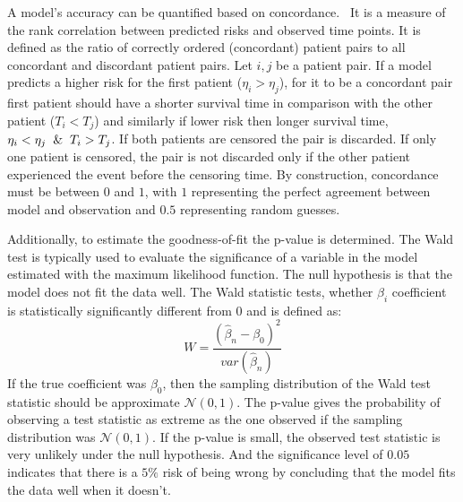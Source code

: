 A model's accuracy can be quantified based on concordance.~\cite{therneau20201} 
It is a measure of the rank correlation between predicted risks and observed time points. 
It is defined as the ratio of correctly ordered (concordant) patient pairs to all concordant and discordant patient pairs.
Let $i, j$ be a patient pair. If a model predicts a higher risk for the first patient ($\eta_i > \eta_j$), for it to be a concordant pair first patient should have a shorter survival time in comparison with the other patient ($ T_i < T_j$) and similarly if lower risk then longer survival time, $\eta_i < \eta_j \And T_i > T_j$.
If both patients are censored the pair is discarded.
If only one patient is censored, the pair is not discarded only if the other patient experienced the event before the censoring time. By construction, concordance must be between $0$ and $1$, with $1$
representing the perfect agreement between model and
observation and $0.5$ representing random guesses.

Additionally, to estimate the goodness-of-fit the p-value is determined. The Wald test is typically used to evaluate the significance of a variable in the model estimated with the maximum likelihood function. The null hypothesis is that the model does not fit the data well. The Wald statistic tests, whether $\beta_i$ coefficient is statistically significantly different from $0$ and is defined as:
$$ W=\frac{(\hat{\beta}_n-\beta_0)^{2}}{var(\hat{\beta}_n)}$$
If the true coefficient was $\beta_0$, then the sampling distribution of
the Wald test statistic should be approximate $\mathcal{N} (0, 1)$. 
The p-value gives the probability of observing a test statistic as extreme as the one observed if the sampling distribution was $\mathcal{N} (0, 1)$. If the p-value is small, the observed test statistic is very
unlikely under the null hypothesis. And the significance level of $0.05$ indicates that there is a $5\%$ risk of being wrong by concluding that the model fits the data well when it doesn't.